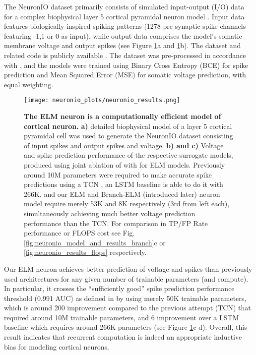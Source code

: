 \documentclass{article} \usepackage{iclr2024_doc_style,times}
\begin{document}
The NeuronIO dataset primarily consists of simulated input-output (I/O) data for a complex biophysical layer 5 cortical pyramidal neuron model \cite{hay2011models}. Input data features biologically inspired spiking patterns (1278 pre-synaptic spike channels featuring -1,1 or 0 as input), while output data comprises the model's somatic membrane voltage and output spikes (see Figure \ref{fig:neuronio_data_and_results}a and \ref{fig:neuronio_data_and_results}b). The dataset and related code is publicly available \cite{beniaguev2021single}. 
The dataset was pre-processed in accordance with \cite{beniaguev2021single}, and the models were trained using Binary Cross Entropy (BCE) for spike prediction and Mean Squared Error (MSE) for somatic voltage prediction, with equal weighting.

\begin{figure}[t]
\centering
    \centering
    \texttt{[image: neuronio\_plots/neuronio\_results.png]}
    \caption{\textbf{The ELM neuron is a computationally efficient model of cortical neuron.} \textbf{a)} detailed biophysical model of a layer 5 cortical pyramidal cell was used to generate the NeuronIO dataset consisting of input spikes and output spikes and voltage. 
    \textbf{b) and c)} Voltage and spike prediction performance of the respective surrogate models, produced using joint ablation of  with  for ELM models. Previously around 10M parameters were required to make accurate spike predictions using a \textcolor{redVar}{TCN} \cite{beniaguev2021single}, an \textcolor{orangeVar}{LSTM} baseline is able to do it with 266K, and our \textcolor{blueVar}{ELM} and \textcolor{lightblueVar}{Branch-ELM} (introduced later) neuron model require merely 53K and 8K respectively (3rd from left each), simultaneously achieving much better voltage prediction performance than the \textcolor{redVar}{TCN}. For comparison in TP/FP Rate performance or FLOPS cost see Fig. \ref{fig:neuronio_model_and_results_branch}c or \ref{fig:neuronio_results_flops} respectively.}
    \label{fig:neuronio_data_and_results}
\end{figure}

Our \textcolor{blueVar}{ELM} neuron achieves better prediction of voltage and spikes than previously used architectures for any given number of trainable parameters (and compute). In particular, it crosses the ``sufficiently good'' spike prediction performance threshold (0.991 AUC) as defined in \citep{beniaguev2021single} by using merely 50K trainable parameters, which is around 200 improvement compared to the previous attempt (\textcolor{redVar}{TCN}) that required around 10M trainable parameters, and 6 improvement over a \textcolor{orangeVar}{LSTM} baseline which requires around 266K parameters (see Figure \ref{fig:neuronio_data_and_results}c-d). Overall, this result indicates that recurrent computation is indeed an appropriate inductive bias for modeling cortical neurons.
\end{document}
